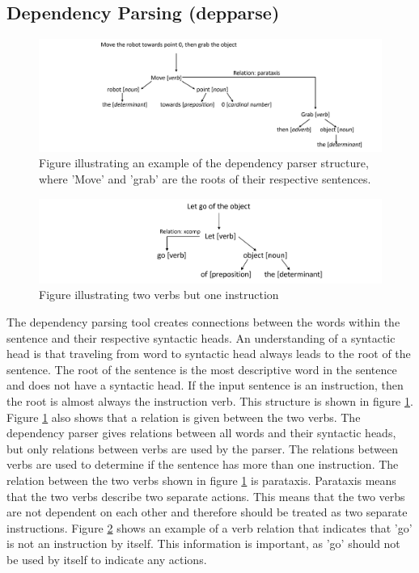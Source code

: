 \subsection{Dependency Parsing (depparse)} \label{sec:dep}
\begin{figure}[ht]
    \centering
    \includegraphics[width=13cm]{img/Dep_parser_structure.png}
    \caption{Figure illustrating an example of the dependency parser structure, where 'Move' and 'grab' are the roots of their respective sentences.}
    \label{fig:DEP_PARSER_exmaple}
\end{figure}


\begin{figure}[ht]
    \centering
    \includegraphics[width=13cm]{img/Dep_parser_example_let_go.png}
    \caption{Figure illustrating two verbs but one instruction}
    \label{fig:DEP_PARSER_exmaple_let_go}
\end{figure}
The dependency parsing tool creates connections between the words within the sentence and their respective syntactic heads. An understanding of a syntactic head is that traveling from word to syntactic head always leads to the root of the sentence. The root of the sentence is the most descriptive word in the sentence and does not have a syntactic head. If the input sentence is an instruction, then the root is almost always the instruction verb. This structure is shown in figure \ref{fig:DEP_PARSER_exmaple}. Figure \ref{fig:DEP_PARSER_exmaple} also shows that a relation is given between the two verbs. The dependency parser gives relations between all words and their syntactic heads, but only relations between verbs are used by the parser. The relations between verbs are used to determine if the sentence has more than one instruction. The relation between the two verbs shown in figure \ref{fig:DEP_PARSER_exmaple} is parataxis. Parataxis means that the two verbs describe two separate actions. This means that the two verbs are not dependent on each other and therefore should be treated as two separate instructions.
Figure \ref{fig:DEP_PARSER_exmaple_let_go} shows an example of a verb relation that indicates that 'go' is not an instruction by itself. This information is important, as 'go' should not be used by itself to indicate any actions.



